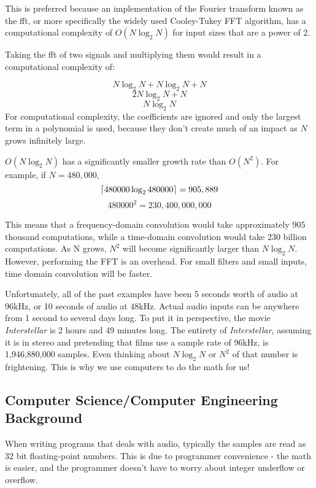 This is preferred because an implementation of the Fourier transform known as the \gls{fft}, or more specifically the widely used Cooley-Tukey FFT algorithm, has a computational complexity of $O(N\log_2{N})$ for input sizes that are a power of 2. 

Taking the \gls{fft} of two signals and multiplying them would result in a computational complexity of:

$$N\log_2{N} + N\log_2{N} + N$$
$$2N\log_2{N} + N $$
$$N\log_2{N}$$
For computational complexity, the coefficients are ignored and only the largest term in a polynomial is used, because they don't create much of an impact as $N$ grows infinitely large.

$O(N\log_2{N})$ has a significantly smaller growth rate than $O(N^2)$. For example, if $N = 480,000$, 
$$\lceil480000\log_2{480000}\rceil = 905,889$$
$$480000^2 = 230,400,000,000$$

This means that a frequency-domain convolution would take approximately 905 thousand computations, while a time-domain convolution would take 230 billion computations. As N grows, $N^2$ will become significantly larger than $N\log_2{N}$. However, performing the FFT is an overhead. For small filters and small inputs, time domain convolution will be faster. 

\vspace{5mm}

Unfortunately, all of the past examples have been 5 seconds worth of audio at 96kHz, or 10 seconds of audio at 48kHz. Actual audio inputs can be anywhere from 1 second to several days long. To put it in perspective, the movie \textit{Interstellar} is 2 hours and 49 minutes long. The entirety of \textit{Interstellar}, assuming it is in stereo and pretending that films use a sample rate of 96kHz, is 1,946,880,000 samples. Even thinking about $N\log_2{N}$ or $N^2$ of that number is frightening. This is why we use computers to do the math for us!

\subsection{Computer Science/Computer Engineering Background}
When writing programs that deals with audio, typically the samples are read as 32 bit floating-point numbers. This is due to programmer convenience - the math is easier, and the programmer doesn't have to worry about integer underflow or overflow.

